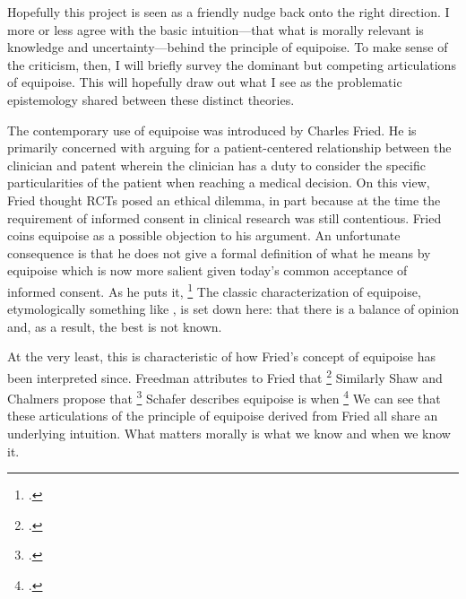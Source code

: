 \documentclass[letterpaper,notitlepage,12pt]{article}
\begin{document}
Hopefully this project is seen as a friendly nudge back onto the right
direction.
I more or less agree with the basic intuition---that what is morally relevant is
knowledge and uncertainty---behind the principle of equipoise.
To make sense of the criticism, then, I will briefly survey the dominant but
competing articulations of equipoise.
This will hopefully draw out what I see as the problematic epistemology shared
between these distinct theories.

The contemporary use of equipoise was introduced by Charles Fried.
He is primarily concerned with arguing for a patient-centered relationship
between the clinician and patent wherein the clinician has a duty to consider
the specific particularities of the patient when reaching a medical decision.
On this view, Fried thought RCTs posed an ethical dilemma, in part because at
the time the requirement of informed consent in clinical research was still
contentious.
Fried coins equipoise as a possible objection to his argument.
An unfortunate consequence is that he does not give a formal definition of what
he means by equipoise which is now more salient given today's common acceptance
of informed consent.
As he puts it, \footcite[p. 58]{fried_medical_2016}
The classic characterization of equipoise, etymologically something like
, is set down here: that there is a balance of opinion
and, as a result, the best is not known.

At the very least, this is characteristic of how Fried's concept of equipoise
has been interpreted since.
Freedman attributes to Fried that \footcite[p.
141]{freedman_equipoise_1987}
Similarly Shaw and Chalmers propose that \footcite[p.487]{shaw_ethics_1970}
Schafer describes equipoise is when \footcite[p.
4]{schafer_commentary_1985}
We can see that these articulations of the principle of equipoise derived
from Fried all share an underlying intuition.
What matters morally is what we know and when we know it.
\end{document}
